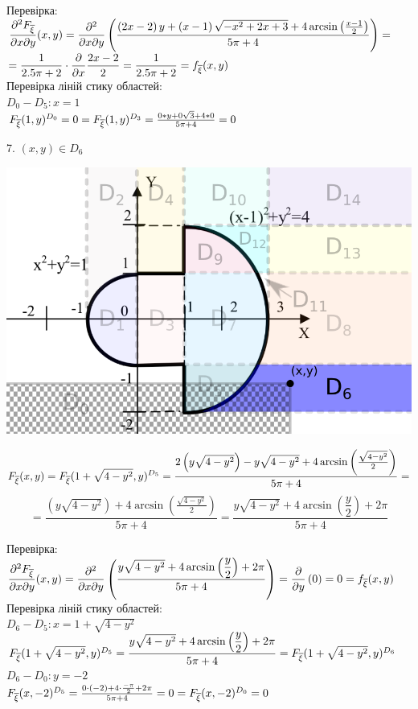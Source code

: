 \documentclass[14pt,a4paper]{scrartcl}
\theoremstyle{definition}
\theoremstyle{remark}
\theoremstyle{definition}
\theoremstyle{definition}
\begin{document}
Перевірка:\\
$\dfrac{\partial^2 F_{\overline{\xi}}}{\partial x \partial y}(x,y) =
\dfrac{\partial^2}{\partial x \partial y} \left( \dfrac{\left(2x-2\right)y+\left(x-1\right)\sqrt{-x^2+2x+3}+4\arcsin\left(\frac{x-1}{2}\right)}{5\pi + 4}\right) = $\\$=\dfrac{1}{2.5\pi + 2} \cdot  \dfrac{\partial}{\partial x} \dfrac{2x-2}{2} = \dfrac{1}{2.5\pi + 2}  =f_{\overline{\xi}} (x,y)$\\

Перевірка ліній стику областей:\\
$D_0 - D_5: x = 1$\\
$ F_{\overline{\xi}} (1,y)^{D_0} = 0 =  F_{\overline{\xi}} (1,y)^{D_3} = \frac{0*y + 0\sqrt{3} + 4* 0}{5\pi + 4} =  0$\\
\newpage

7. $(x,y) \in D_6$
\begin{center} \includegraphics[scale=0.4]{assets/zone766.png} \end{center}
$$
F_{\overline{\xi}} (x,y) =  F_{\overline{\xi}} (1+\sqrt{4 - y^2}, y)^{D_5} =  \dfrac{2\left(y\sqrt{4 - y^2}\right)-y\sqrt{4 - y^2}+4\arcsin\left(\frac{\sqrt{4 - y^2}}{2}\right)}{5\pi +4}=
$$
$$
= \dfrac{\left(y\sqrt{4 - y^2}\right) + 4\arcsin\left(\frac{\sqrt{4 - y^2}}{2}\right)}{5\pi +4} =  \dfrac{y\sqrt{4 - y^2} + 4\arcsin\left(\dfrac{y}{2}\right) + 2\pi }{5\pi +4}
$$


Перевірка:\\
$\dfrac{\partial^2 F_{\overline{\xi}}}{\partial x \partial y}(x,y) =
\dfrac{\partial^2}{\partial x \partial y} \left(  \dfrac{y\sqrt{4 - y^2} + 4\arcsin\left(\dfrac{y}{2}\right) + 2\pi }{5\pi +4}
\right) = \dfrac{\partial}{ \partial y} \left(0 \right)  = 0=f_{\overline{\xi}} (x,y)$\\

Перевірка ліній стику областей:\\
$D_6 - D_5: x = 1 + \sqrt{4 - y^2}$\\
$ F_{\overline{\xi}} (1 + \sqrt{4 - y^2},y)^{D_5} =  \dfrac{y\sqrt{4 - y^2} + 4\arcsin\left(\dfrac{y}{2}\right) + 2\pi }{5\pi +4} = F_{\overline{\xi}} (1 + \sqrt{4 - y^2},y)^{D_6}$\\
$D_6 - D_0: y = -2$\\
$ F_{\overline{\xi}} (x,-2)^{D_5} =  \frac{0\cdot (-2) + 4 \cdot \frac{-\pi}{2}+ 2\pi  }{5\pi +4} = 0  = F_{\overline{\xi}} (x,-2)^{D_0} = 0$\\
\end{document}
